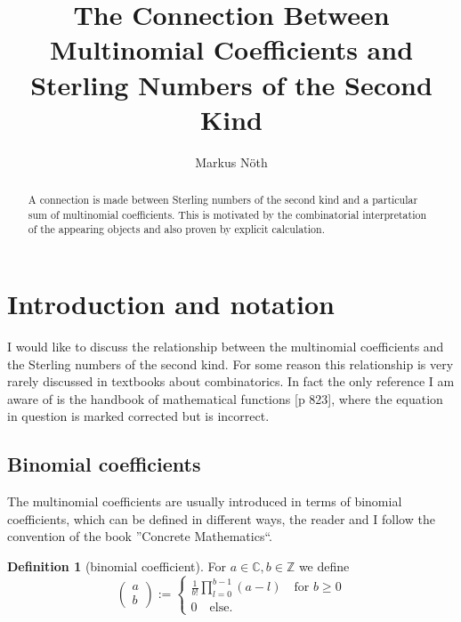 \documentclass{article}
\theoremstyle{theorem}
\theoremstyle{definition}
\newtheorem*{definition}{Definition}
\begin{document}
\title{The Connection Between Multinomial Coefficients and Sterling Numbers of the Second Kind}
\author{Markus Nöth}

\maketitle

\begin{abstract}
A connection is made between Sterling numbers of the second kind and a particular sum of multinomial coefficients. 
This is motivated by the combinatorial interpretation of the appearing objects and also proven by explicit calculation.
\end{abstract}


\noindent

\section*{Introduction and notation}

I would like to discuss the relationship between the multinomial coefficients and the Sterling numbers of the second kind.
For some reason this relationship is very rarely discussed in textbooks about combinatorics. In fact the only reference I
am aware of is the handbook of mathematical functions \cite{abramowitz1964handbook}[p 823], where the equation in 
question is marked corrected but is incorrect. 

\subsection*{Binomial coefficients}

The multinomial coefficients are usually introduced in terms of binomial coefficients, which can be defined in different ways,
the reader and I follow the convention of the book ''Concrete Mathematics``\cite{graham1994concrete}.

\begin{definition}[binomial coefficient]
For \(a\in\mathbb{C}, b\in\mathbb{Z}\) we define
\begin{equation}
\begin{pmatrix}a\\b\end{pmatrix} := \left\{\begin{matrix}
\frac{1}{b!}\prod_{l=0}^{b-1} (a-l) \quad \text{for } b\ge 0\\
0 \quad \text{else.}
\end{matrix} \right.
\end{equation}
\end{definition}
\end{document}
